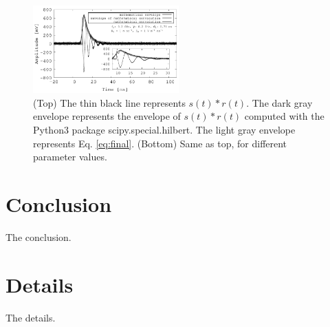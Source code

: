 \documentclass[amsmath,amssymb,aps,prd,10pt,twocolumn,showkeys]{revtex4}
\begin{document}
\begin{itemize}
\begin{figure}[hb]
\includegraphics[width=0.5\textwidth]{March12_plot2.pdf}
\caption{\label{fig:fig1} (Top) The thin black line represents $s(t) * r(t)$.  The dark gray envelope represents the envelope of $s(t) * r(t)$ computed with the Python3 package scipy.special.hilbert. The light gray envelope represents Eq. \ref{eq:final}. (Bottom) Same as top, for different parameter values.}
\end{figure}
\end{itemize}
\clearpage

\section{Conclusion}
\label{sec:conc}

The conclusion.

\appendix

\section{Details}
\label{app:a}

The details.


\end{document}
